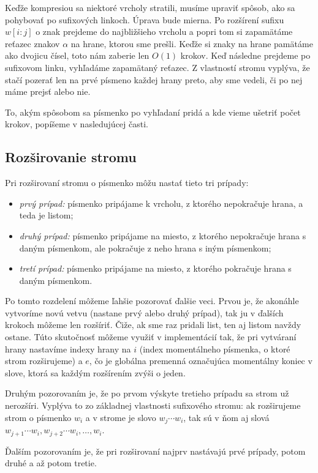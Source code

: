 Keďže kompresiou sa niektoré vrcholy stratili, musíme upraviť spôsob, ako sa 
pohybovať po sufixových linkoch. Úprava bude mierna. Po rozšírení sufixu 
$w[i:j]$ o znak prejdeme do najbližšieho vrcholu a popri tom si zapamätáme 
reťazec znakov $\alpha$ na hrane, ktorou sme prešli. Keďže si znaky na hrane 
pamätáme ako dvojicu čísel, toto nám zaberie len $O(1)$ krokov. Keď následne 
prejdeme po sufixovom linku, vyhľadáme zapamätaný reťazec. Z vlastností stromu 
vyplýva, že stačí pozerať len na prvé písmeno každej hrany preto, aby sme 
vedeli, či po nej máme prejsť alebo nie.

To, akým spôsobom sa písmenko po vyhľadaní pridá a kde vieme ušetriť počet 
krokov, popíšeme v nasledujúcej časti.

\subsection{Rozširovanie stromu}

Pri rozširovaní stromu o písmenko môžu nastať tieto tri prípady:
\begin{itemize}
\item \emph{prvý prípad:} písmenko pripájame k vrcholu, z ktorého nepokračuje 
hrana, a teda je listom;
\item \emph{druhý prípad:} písmenko pripájame na miesto, z ktorého nepokračuje 
hrana s daným písmenkom, ale pokračuje z neho hrana s iným písmenkom;
\item \emph{tretí prípad:} písmenko pripájame na miesto, z ktorého pokračuje 
hrana s daným písmenkom.
\end{itemize}

Po tomto rozdelení môžeme ľahšie pozorovať ďalšie veci. Prvou je, že akonáhle 
vytvoríme novú vetvu (nastane prvý alebo druhý prípad), tak ju v ďalších 
krokoch môžeme len rozšíriť. Čiže, ak sme raz pridali list, ten aj listom 
navždy ostane. Túto skutočnosť môžeme využiť v implementácií tak, že pri 
vytváraní hrany 
nastavíme indexy hrany na $i$ (index momentálneho písmenka, o ktoré strom 
rozširujeme) a $e$, čo je globálna premenná označujúca momentálny koniec v 
slove, ktorá sa každým rozšírením zvýši o jeden.

Druhým pozorovaním je, že po prvom výskyte tretieho prípadu sa strom už 
nerozšíri. Vyplýva to zo základnej vlastnosti sufixového stromu: ak 
rozširujeme strom o písmenko $w_i$ a v strome je slovo $w_j\cdots w_i$, tak 
sú v ňom aj slová $w_{j+1}\cdots w_i, w_{j+2}\cdots w_i, \ldots, w_i$.

Ďalším pozorovaním je, že pri rozširovaní najprv nastávajú prvé prípady, 
potom druhé a až potom tretie.

